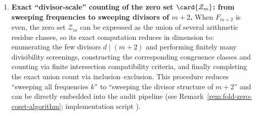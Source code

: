 \begin{enumerate}
  \item \textbf{Exact ``divisor-scale'' counting of the zero set \texorpdfstring{$\card{\mathcal{Z}_m}$}{|Z\_m|}: from sweeping frequencies to sweeping divisors of \texorpdfstring{$m+2$}{m+2}.}
  When \(F_{m+2}\) is even, the zero set \(\mathcal{Z}_m\) can be expressed as the union of several arithmetic residue classes, so its exact computation reduces in dimension to:
  enumerating the few divisors \(d\mid(m+2)\) and performing finitely many divisibility screenings, constructing the corresponding congruence classes and counting via finite intersection compatibility criteria, and finally completing the exact union count via inclusion--exclusion.
  This procedure reduces ``sweeping all frequencies \(k\)'' to ``sweeping the divisor structure of \(m+2\)'' and can be directly embedded into the audit pipeline (see Remark~\ref{rem:fold-zero-coset-algorithm}; implementation script \texttt{}).
\end{enumerate}


